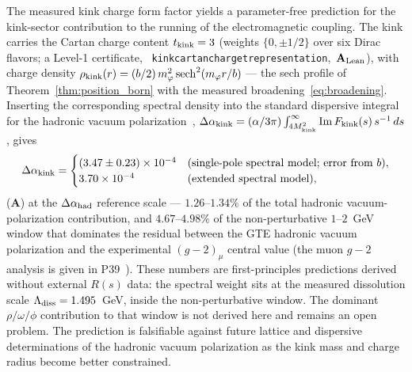 \documentclass[11pt]{article}
\theoremstyle{remark}
\newcommand{\lean}[1]{%
  \penalty-100
  \begingroup\def\_{\textunderscore\allowbreak}\texttt{#1}\endgroup}
\newcommand{\CatA}{\textbf{A}}
\newcommand{\CatAL}{\ensuremath{\textbf{A}_{\rm Lean}}}
\begin{document}
The measured kink charge form factor yields a parameter-free prediction for
the kink-sector contribution to the running of the electromagnetic coupling.
The kink carries the Cartan charge content $t_{\rm kink} = 3$ (weights
$\{0, \pm1/2\}$ over six Dirac flavors; a Level-1 certificate,
\mbox{\lean{kink\_cartan\_charge\_trepresentation}, $\CatAL$}), with charge
density $\rho_{\rm kink}(r) = (b/2)\,m_\varphi^2\,
\mathrm{sech}^2(m_\varphi r/b)$ --- the sech profile of
Theorem~\ref{thm:position_born} with the measured
broadening~\eqref{eq:broadening}.  Inserting the corresponding spectral
density into the standard dispersive integral for the hadronic vacuum
polarization~\cite{Aoyama2020MuonGm2},
$\Delta\alpha_{\rm kink} = (\alpha/3\pi)\int_{4M_{\rm kink}^2}^{\infty}
\mathrm{Im}\,F_{\rm kink}(s)\,s^{-1}\,ds$, gives
\begin{equation}
  \Delta\alpha_{\rm kink} =
  \begin{cases}
    (3.47 \pm 0.23)\times10^{-4} & \text{(single-pole spectral model; error from $b$)},\\
    3.70\times10^{-4} & \text{(extended spectral model)},
  \end{cases}
  \label{eq:delta_alpha_kink}
\end{equation}
($\CatA$) at the $\Delta\alpha_{\rm had}$ reference scale --- $1.26$--$1.34\%$
of the total hadronic vacuum-polarization contribution, and
$4.67$--$4.98\%$ of the non-perturbative $1$--$2$~GeV window that dominates
the residual between the GTE hadronic vacuum polarization and the
experimental $(g-2)_\mu$ central value (the muon $g-2$ analysis is given in
P39~\cite{SpivackGTEQCDStructure}).  These numbers are first-principles
predictions derived without external $R(s)$ data: the spectral weight sits
at the measured dissolution scale $\Lambda_{\rm diss} = 1.495$~GeV, inside
the non-perturbative window.  The dominant $\rho/\omega/\phi$ contribution
to that window is not derived here and remains an open problem.  The
prediction is falsifiable against future lattice and dispersive
determinations of the hadronic vacuum polarization as the kink mass and
charge radius become better constrained.
\end{document}
